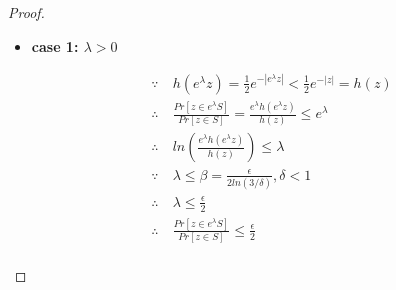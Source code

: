 \begin{proof}

\begin{itemize}

	From the integral substitution property, we have:

	\begin{equation*}
	\begin{split}
	\frac{Pr[z \in e^{\lambda} S]}{Pr[z \in S]} 
		= &\frac
		{\int_{e^{\lambda} S}{} \frac{1}{2}e^{-|z|} dz}
		{\int_{S}{} \frac{1}{2}e^{-|z|} dz} \\
		= &\frac
		{\int_{S}{} \frac{1}{2}e^{-|e^{\lambda}z|} e^{\lambda} dz}
		{\int_{S}{} \frac{1}{2}e^{-|z|}dz} \\
		= & \frac{e^{-|e^{\lambda}z|} e^{\lambda}}{e^{-|z|}} \\
		= & \frac{e^{\lambda} h(e^{\lambda} z)}{h(z)}\\
	\end{split}
	\end{equation*}

	Then, we proof the dilation property in cases of $\lambda > 0$ and $\lambda < 0$ separately:

	\item \textbf{case 1: $\lambda > 0$}

	\begin{equation*}
	\begin{split}
	\because\ 		& 	h(e^{\lambda} z) =  \frac{1}{2} e^{-|e^{\lambda} z|} < \frac{1}{2} e^{-|z|} = h(z)\\
	\therefore\		& 	\frac{Pr[z \in e^{\lambda} S]}{Pr[z \in S]} 
						= \frac{e^{\lambda} h(e^{\lambda} z)}{h(z)}
						\leq e^{\lambda}\\
	\therefore\		&	ln(\frac{e^{\lambda} h(e^{\lambda} z)}{h(z)})
						\leq \lambda \\
	\because\		&	\lambda \leq \beta = \frac{\epsilon}{2 ln(3 / \delta)}, \delta < 1 \\
	\therefore\		&	\lambda \leq \frac{\epsilon}{2} \\
	\therefore\		&	\frac{Pr[z \in e^{\lambda} S]}{Pr[z \in S]} \leq \frac{\epsilon}{2} \\
	\end{split}
	\end{equation*}


\end{itemize}
\end{proof}
